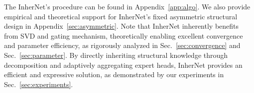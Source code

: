 \documentclass{article} %
\begin{document}



The InherNet's procedure can be found in Appendix~\ref{app:algo}. We also provide empirical and theoretical support for InherNet's fixed asymmetric structural design in Appendix~\ref{sec:asymmetric}. Note that InherNet inherently benefits from SVD and gating mechanism, theoretically enabling excellent convergence and parameter efficiency, as rigorously analyzed in Sec.~\ref{sec:convergence} and Sec.~\ref{sec:parameter}. By directly inheriting structural knowledge through decomposition and adaptively aggregating expert heads, InherNet provides an efficient and expressive solution, as demonstrated by our experiments in Sec.~\ref{sec:experiments}.


\end{document}
